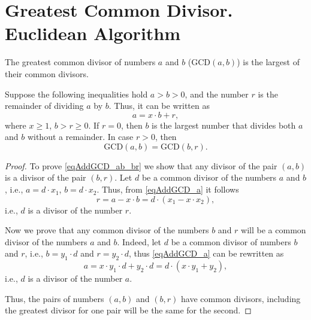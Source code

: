 \section{Greatest Common Divisor. Euclidean Algorithm}
\label{AddEuclidean}
\begin{definition}
The greatest common divisor of numbers $a$ and $b$ ($\mbox{GCD}\left(a, b\right)$) is the largest of their common divisors.
\label{defAddGCD}
\end{definition}

\begin{theorem}
Suppose the following inequalities hold $a > b > 0$, and the number $r$ is the remainder of dividing $a$ by $b$. Thus, it can be written as
\begin{equation}
a = x \cdot b + r,
\label{eqAddGCD_a}
\end{equation}
where $x \ge 1$, $b > r \ge 0$. If $r=0$, then $b$ is the largest number that divides both $a$ and $b$ without a remainder. In case $r > 0$, then
\begin{equation}
\mbox{GCD}\left(a, b\right) = \mbox{GCD}\left(b, r\right).
\label{eqAddGCD_ab_br}
\end{equation}
\end{theorem}

\begin{proof}
To prove \eqref{eqAddGCD_ab_br} we show that any divisor of the pair $\left(a,b\right)$ is a divisor of the pair $\left(b,r\right)$. Let $d$ be a common divisor of the numbers $a$ and $b$, i.e., $a = d \cdot x_1$, $b = d \cdot x_2$. Thus, from \eqref{eqAddGCD_a} it follows
\begin{equation}
r = a - x \cdot b = d \cdot \left( x_1 - x \cdot x_2 \right),
\nonumber
\end{equation}
i.e., $d$ is a divisor of the number $r$.

Now we prove that any common divisor of the numbers $b$ and $r$ will be a common divisor of the numbers $a$ and $b$. Indeed, let $d$ be a common divisor of numbers $b$ and $r$, i.e., $b = y_1 \cdot d$ and $r = y_2 \cdot d$, thus \eqref{eqAddGCD_a} can be rewritten as
\begin{equation}
a = x \cdot y_1 \cdot d + y_2 \cdot d = d \cdot \left( x \cdot y_1 + y_2 \right),
\nonumber
\end{equation}
i.e., $d$ is a divisor of the number $a$.

Thus, the pairs of numbers $\left(a,b\right)$ and $\left(b,r\right)$ have common divisors, including the greatest divisor for one pair will be the same for the second.
\end{proof}

